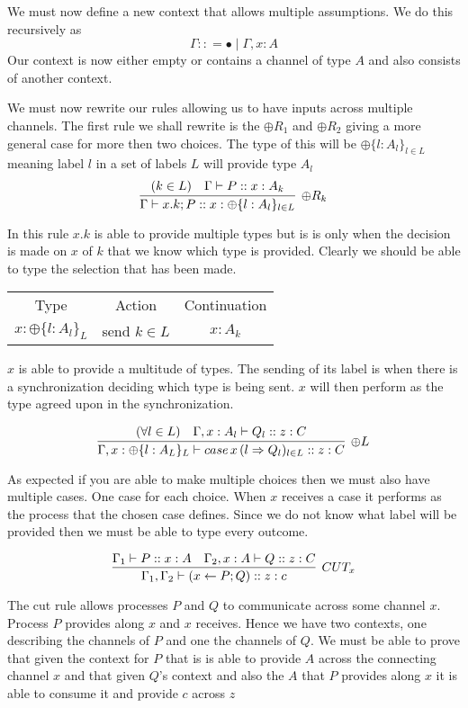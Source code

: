 \documentclass{article}
\begin{document}
We must now define a new context that allows multiple assumptions. We do this recursively as 
\[ \Gamma :: = 	\bullet \mid \Gamma , x:A \]
Our context is now either empty or contains a channel of type \(A\) and also consists of another context.


We must now rewrite our rules allowing us to have inputs across multiple channels. The first rule we shall rewrite is the \(\oplus R_1 \) and \(\oplus R _2\) giving a more general case for more then two choices. The type of this will be \(\oplus \{ l:A_l \}_{l \in L}\) meaning label \(l\) in a set of labels \(L\) will provide type \(A_l\)
\[
\infer[{\oplus R_k}]
    {\Gamma \vdash x.k;P :: x : \oplus \{ l : A_l \} _{l \in L}}
    {(k \in L) & \Gamma \vdash P :: x:A_k }
\]

In this rule \(x.k\) is able to provide multiple types but is is only when the decision is made on \(x\) of \(k\) that we know which type is provided. Clearly we should be able to type the selection that has been made.


\begin{center}
    \begin{tabular}{ c c c }
     Type & Action & Continuation \\ 
     \(x:\oplus \{ l: A_{l} \}_{L}\) & send \(k \in L\) & \(x:A_k\)   
    \end{tabular}
\end{center}

\(x\) is able to provide a multitude of types. The sending of its label is when there is a synchronization deciding which type is being sent. \(x\) will then perform as the type agreed upon in the synchronization.


\[
\infer[{\oplus L}]
    {\Gamma, x: \oplus \{ l : A_L\}_L \vdash case \, x \, (l \Rightarrow Q_l)_{l \in L} :: z : C }
    {(\forall l \in L) & \Gamma, x:A_l \vdash Q_l :: z:C }
\]

As expected if you are able to make multiple choices then we must also have multiple cases. One case for each choice. When \(x\) receives a case it performs as the process that the chosen case defines. Since we do not know what label will be provided then we must be able to type every outcome.


\[
\infer[{CUT_x}]
    {\Gamma_1 , \Gamma_2 \vdash ( x \leftarrow P ; Q ) :: z :c }
    { \Gamma_1 \vdash P :: x :A & \Gamma_2 , x:A \vdash Q :: z:C }
\]

The cut rule allows processes \(P\) and \(Q\) to communicate across some channel \(x\). Process \(P\) provides along \(x\) and \(x\) receives. Hence we have two contexts, one describing the channels of \(P\) and one the channels of \(Q\). We must be able to prove that given the context for \(P\) that is is able to provide \(A\) across the connecting channel \(x\) and that given \(Q\)'s context and also the \(A\) that \(P\) provides along \(x\) it is able to consume it and provide \(c\) across \(z\)
\end{document}
